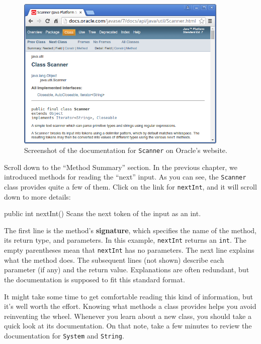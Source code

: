 \documentclass[12pt]{book}
\theoremstyle{exercise}
\newcommand{\java}[1]{\lstinline{#1}} %
\begin{document}
\begin{figure}[!h]
\begin{center}
\includegraphics[width=0.9\textwidth]{figs/scanner.png}
\caption{Screenshot of the documentation for \java{Scanner} on Oracle's website.}
\label{fig:javadoc}
\end{center}
\end{figure}

Scroll down to the ``Method Summary'' section.
In the previous chapter, we introduced methods for reading the ``next'' input.
As you can see, the \java{Scanner} class provides quite a few of them.
Click on the link for \java{nextInt}, and it will scroll down to more details:

\begin{stdout}
public int nextInt()
Scans the next token of the input as an int.
\end{stdout}


The first line is the method's {\bf signature}, which specifies the name of the method, its return type, and parameters.
In this example, \java{nextInt} returns an \java{int}.
The empty parentheses mean that \java{nextInt} has no parameters.
The next line explains what the method does.
The subsequent lines (not shown) describe each parameter (if any) and the return value.
Explanations are often redundant, but the documentation is supposed to fit this standard format.

It might take some time to get comfortable reading this kind of information, but it's well worth the effort.
Knowing what methods a class provides helps you avoid reinventing the wheel.
Whenever you learn about a new class, you should take a quick look at its documentation.
On that note, take a few minutes to review the documentation for \java{System} and \java{String}.
\end{document}
